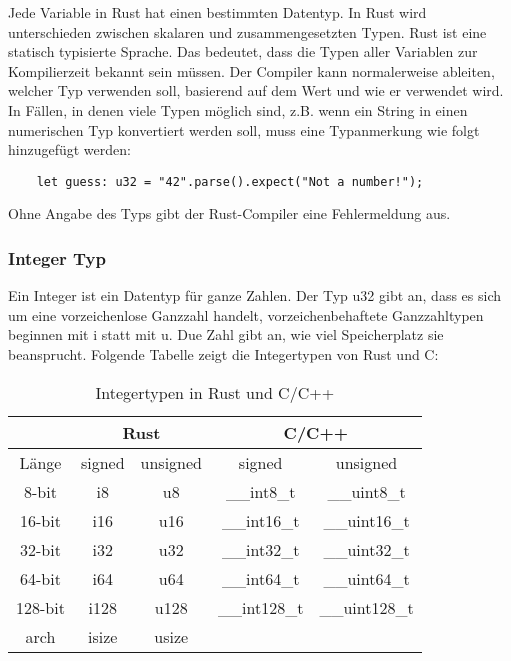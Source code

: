 Jede Variable in Rust hat einen bestimmten Datentyp. In Rust wird unterschieden zwischen skalaren und zusammengesetzten Typen. Rust ist eine statisch typisierte Sprache. Das bedeutet, dass die Typen aller Variablen zur Kompilierzeit bekannt sein müssen. Der Compiler kann normalerweise ableiten, welcher Typ verwenden soll, basierend auf dem Wert und wie er verwendet wird. In Fällen, in denen viele Typen möglich sind, z.B. wenn ein String in einen numerischen Typ konvertiert werden soll, muss eine Typanmerkung wie folgt hinzugefügt werden:

\begin{lstlisting}
    let guess: u32 = "42".parse().expect("Not a number!");
\end{lstlisting}

Ohne Angabe des Typs gibt der Rust-Compiler eine Fehlermeldung aus.

\subsubsection{Integer Typ}

Ein Integer ist ein Datentyp für ganze Zahlen. Der Typ \glqq u32\grqq{} gibt an, dass es sich um eine vorzeichenlose Ganzzahl handelt, vorzeichenbehaftete Ganzzahltypen beginnen mit \glqq i\grqq{} statt mit \glqq u\grqq{}. Due Zahl gibt an, wie viel Speicherplatz sie beansprucht. Folgende Tabelle zeigt die Integertypen von Rust und C:

\begin{table}[htbp]
\centering
\begin{tabular}{|c||c|c||c|c|}
\hline
\rule[-1ex]{0pt}{2.5ex} & \multicolumn{2}{|c||}{Rust} & \multicolumn{2}{|c|}{C/C++} \\
\hline
\rule[-1ex]{0pt}{2.5ex} Länge & signed & unsigned & signed & unsigned \\
\hline
\rule[-1ex]{0pt}{2.5ex} 8-bit & i8 & u8 & \_\_int8\_t & \_\_uint8\_t \\
\hline
\rule[-1ex]{0pt}{2.5ex} 16-bit & i16 & u16 & \_\_int16\_t & \_\_uint16\_t \\
\hline
\rule[-1ex]{0pt}{2.5ex} 32-bit & i32 & u32 & \_\_int32\_t & \_\_uint32\_t \\
\hline
\rule[-1ex]{0pt}{2.5ex} 64-bit & i64 & u64 & \_\_int64\_t & \_\_uint64\_t \\
\hline
\rule[-1ex]{0pt}{2.5ex} 128-bit & i128 & u128 & \_\_int128\_t & \_\_uint128\_t \\
\hline
\rule[-1ex]{0pt}{2.5ex} arch & isize & usize & & \\
\hline
\end{tabular}
\caption{Integertypen in Rust und C/C++}
\end{table}

